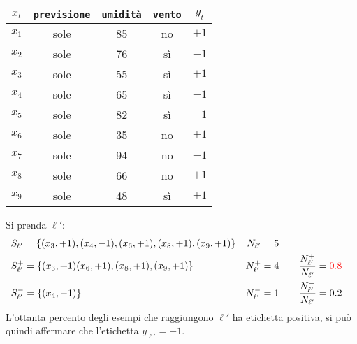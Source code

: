 \vspace{.7em}
\begin{minipage}{.49\textwidth}
    \captionsetup{type=table}
    \begin{center}
        \begin{tabular}{|c|c|c|c|c|} \hline
            $x_t$ & \texttt{previsione} & \texttt{umidità} & \texttt{vento} & $y_t$ \\ \hline
            \rowcolor{orange!40}$x_1$ & sole & 85 & no & $+1$\\
            \rowcolor{orange!40}$x_2$ & sole & 76 & sì & $-1$\\
            \rowcolor{cyan!40}  $x_3$ & sole & 55 & sì & $+1$\\
            \rowcolor{cyan!40}  $x_4$ & sole & 65 & sì & $-1$\\
            \rowcolor{orange!40}$x_5$ & sole & 82 & sì & $-1$\\
            \rowcolor{cyan!40}  $x_6$ & sole & 35 & no & $+1$\\
            \rowcolor{orange!40}$x_7$ & sole & 94 & no & $-1$\\
            \rowcolor{cyan!40}  $x_8$ & sole & 66 & no & $+1$\\
            \rowcolor{cyan!40}  $x_9$ & sole & 48 & sì & $+1$\\ \hline
        \end{tabular}
    \end{center}
\end{minipage}
\begin{minipage}{.49\textwidth}
    \captionsetup{type=figure}
    \centering
    
\end{minipage}

Si prenda $\ell'$:
$$
\begin{aligned}
    &S_{\ell'} = \{ (x_3,+1),(x_4,-1),(x_6,+1),(x_8,+1),(x_9,+1) \} & N_{\ell'}=5 \\
    &S_{\ell'}^+ = \{ (x_3,+1)(x_6,+1),(x_8,+1),(x_9,+1) \} & N_{\ell'}^+=4 
        & \qquad \frac{N_{\ell'}^+}{N_{\ell'}}={\color{red}0.8} \\
    &S_{\ell'}^- = \{ (x_4,-1) \} & N_{\ell'}^-=1 & \qquad \frac{N_{\ell'}^-}{N_{\ell'}}=0.2 \\
\end{aligned}
$$
L'{\color{red}ottanta percento} degli esempi che raggiungono $\ell'$ ha etichetta
positiva, si può quindi affermare che l'etichetta $y_{\ell'}=+1$.

